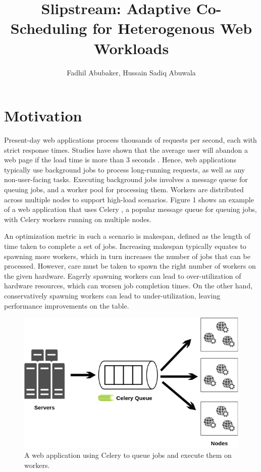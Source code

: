 \documentclass{proc}
\title{Slipstream: Adaptive Co-Scheduling for Heterogenous Web Workloads}
\author{Fadhil Abubaker, Hussain Sadiq Abuwala}
\date{}
\begin{document}
\maketitle

\section{Motivation}

Present-day web applications process thousands of requests per second, each with
strict response times. Studies have shown that the average user will abandon a
web page if the load time is more than 3 seconds \cite{Akamai}. Hence, web
applications typically use background jobs to process long-running requests, as
well as any non-user-facing tasks. Executing background jobs involves a message
queue for queuing jobs, and a worker pool for processing them. Workers are
distributed across multiple nodes to support high-load scenarios. Figure 1 shows
an example of a web application that uses Celery \cite{Celery}, a popular
message queue for queuing jobs, with Celery workers running on multiple nodes.

An optimization metric in such a scenario is makespan, defined as the length of
time taken to complete a set of jobs. Increasing makespan typically equates to
spawning more workers, which in turn increases the number of jobs that can be
processed. However, care must be taken to spawn the right number of workers on
the given hardware. Eagerly spawning workers can lead to over-utilization of
hardware resources, which can worsen job completion times. On the other hand,
conservatively spawning workers can lead to under-utilization, leaving
performance improvements on the table.

\begin{figure}
  \includegraphics[width=\linewidth]{celery-diagram.png}
  \caption{A web application using Celery to queue jobs and execute them on workers.}
\end{figure}
\end{document}
